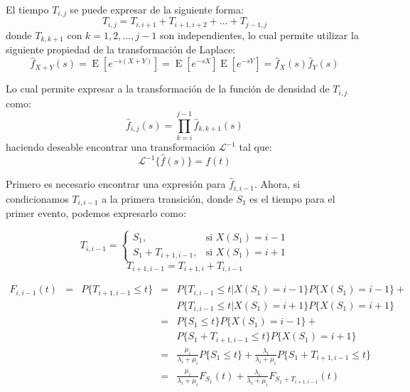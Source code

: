 \documentclass[11pt]{article}
\numberwithin{equation}{section} %
\begin{document}
El tiempo $T_{i,j}$ se puede expresar de la siguiente forma:
\begin{equation}
T_{i,j}=T_{i,i+1}+T_{i+1,i+2}+\ldots+T_{j-1,j}
\end{equation}
donde $T_{k,k+1}$ con $k=1,2,\ldots,j-1$ son independientes, lo cual permite utilizar la siguiente propiedad de la transformación de Laplace:
\begin{equation}
\hat{f}_{X+Y}(s)=\operatorname{E}[e^{-s(X+Y)}]=\operatorname{E}[e^{-sX}]\operatorname{E}[e^{-sY}]=\hat{f}_{X}(s)\hat{f}_{Y}(s)
\end{equation}

Lo cual permite expresar a la transformación de la función de densidad de $T_{i,j}$ como:
\begin{equation}
\hat{f}_{i,j}(s)=\prod_{k=i}^{j-1}\hat{f}_{k,k+1}(s)
\end{equation}
haciendo deseable encontrar una transformación $\mathcal{L}^{-1}$ tal que:
\begin{equation}
\mathcal{L}^{-1}\{\hat{f}(s)\}=f(t)
\end{equation}

Primero es necesario encontrar una expresión para $\hat{f}_{i,i-1}$. Ahora, si condicionamos $T_{i,i-1}$ a la primera transición, donde $S_1$ es el tiempo para el primer evento, podemos expresarlo como:

\begin{equation}
T_{i,i-1} =
\begin{cases}
S_{1}, & \mbox{si } X(S_{1})=i-1 \\
S_{1}+T_{i+1,i-1}, & \mbox{si } X(S_{1})=i+1
\end{cases}
\end{equation}
\begin{equation}
T_{i+1,i-1}=T_{i+1,i}+T_{i,i-1}
\end{equation}
 
\[
\begin{array}{rcrcl}
F_{i,i-1}(t) & = & P\{ T_{i+1,i-1}\leq t \} & = & P\{ T_{i,i-1}\leq t | X(S_{1})=i-1 \}P\{ X(S_{1})=i-1 \} +\\
 & & & & P\{ T_{i,i-1}\leq t | X(S_{1})=i+1 \}P\{ X(S_{1})=i+1 \} \\
 & & & = & P\{ S_{1}\leq t\}P\{ X(S_{1})=i-1 \} +\\
 & & & & P\{ S_{1} + T_{i+1,i-1}\leq t\}P\{ X(S_{1})=i+1 \} \\
 & & & = & \frac{\mu_{i}}{\lambda_{i}+\mu_{i}} P\{ S_{1}\leq t\} + \frac{\lambda_{i}}{\lambda_{i}+\mu_{i}} P\{ S_{1} + T_{i+1,i-1}\leq t\}\\
 & & & = & \frac{\mu_{i}}{\lambda_{i}+\mu_{i}} F_{S_{1}}(t) + \frac{\lambda_{i}}{\lambda_{i}+\mu_{i}} F_{ S_{1} + T_{i+1,i-1}}(t)\\
\end{array}
\]
 
\end{document}
